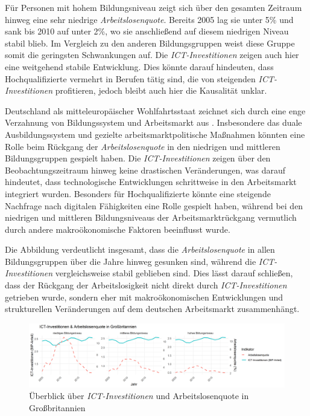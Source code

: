 Für Personen mit hohem Bildungsniveau zeigt sich über den gesamten Zeitraum hinweg 
eine sehr niedrige \textit{Arbeitslosenquote}. Bereits 2005 lag sie unter 5\% und 
sank bis 2010 auf unter 2\%, wo sie anschließend auf diesem niedrigen Niveau stabil blieb. 
Im Vergleich zu den anderen Bildungsgruppen weist diese Gruppe somit die geringsten 
Schwankungen auf. Die \textit{\ac{ICT}-Investitionen} zeigen auch hier eine 
weitgehend stabile Entwicklung. Dies könnte darauf hindeuten, dass Hochqualifizierte 
vermehrt in Berufen tätig sind, die von steigenden \textit{\ac{ICT}-Investitionen} 
profitieren, jedoch bleibt auch hier die Kausalität unklar.

Deutschland als mitteleuropäischer Wohlfahrtsstaat zeichnet sich durch eine enge 
Verzahnung von Bildungssystem und Arbeitsmarkt aus 
\parencite[vgl.][S. 21–27]{hall2001varieties}. Insbesondere das duale Ausbildungssystem 
und gezielte arbeitsmarktpolitische Maßnahmen könnten eine Rolle beim Rückgang der 
\textit{Arbeitslosenquote} in den niedrigen und mittleren Bildungsgruppen gespielt haben. 
Die \textit{\ac{ICT}-Investitionen} zeigen über den Beobachtungszeitraum hinweg keine 
drastischen Veränderungen, was darauf hindeutet, dass technologische Entwicklungen 
schrittweise in den Arbeitsmarkt integriert wurden. Besonders für Hochqualifizierte 
könnte eine steigende Nachfrage nach digitalen Fähigkeiten eine Rolle gespielt 
haben, während bei den niedrigen und mittleren Bildungsniveaus der 
Arbeitsmarktrückgang vermutlich durch andere makroökonomische Faktoren beeinflusst 
wurde.

Die Abbildung verdeutlicht insgesamt, dass die \textit{Arbeitslosenquote} in allen 
Bildungsgruppen über die Jahre hinweg gesunken sind, während die 
\textit{\ac{ICT}-Investitionen} vergleichsweise stabil geblieben sind. Dies lässt darauf 
schließen, dass der Rückgang der Arbeitslosigkeit nicht direkt durch 
\textit{\ac{ICT}-Investitionen} getrieben wurde, sondern eher mit makroökonomischen 
Entwicklungen und strukturellen Veränderungen auf dem deutschen Arbeitsmarkt 
zusammenhängt.

\begin{figure}[htbp]
    \centering
    \includegraphics[width=\textwidth]{assets/plot_uk_final.png}
    \caption{Überblick über \textit{\ac{ICT}-Investitionen} und Arbeitslosenquote in 
    Großbritannien}
    \label{fig:uk}
\end{figure}

